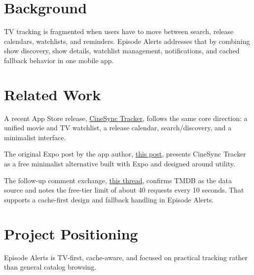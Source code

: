 \section{Background}
TV tracking is fragmented when users have to move between search, release calendars, watchlists, and reminders. Episode Alerts addresses that by combining show discovery, show details, watchlist management, notifications, and cached fallback behavior in one mobile app.

\section{Related Work}
A recent App Store release, \href{https://apps.apple.com/au/app/cinesync-tracker/id6757942706}{CineSync Tracker}, follows the same core direction: a unified movie and TV watchlist, a release calendar, search/discovery, and a minimalist interface.

The original Expo post by the app author, \href{https://www.reddit.com/r/expo/comments/1qnsnye/i_got_sick_of_movie_apps_feeling_like_adfilled/?utm_source=share&utm_medium=web3x&utm_name=web3xcss&utm_term=1}{this post}, presents CineSync Tracker as a free minimalist alternative built with Expo and designed around utility.

The follow-up comment exchange, \href{https://www.reddit.com/r/expo/comments/1qnsnye/comment/o2ervfs/?context=3}{this thread}, confirms TMDB as the data source and notes the free-tier limit of about 40 requests every 10 seconds. That supports a cache-first design and fallback handling in Episode Alerts.

\section{Project Positioning}
Episode Alerts is TV-first, cache-aware, and focused on practical tracking rather than general catalog browsing.
